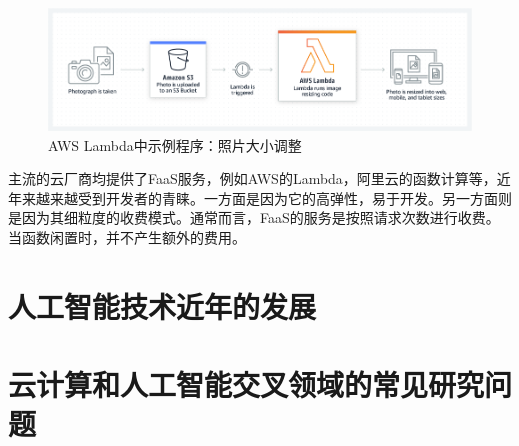 \begin{figure}
    \centerline{\includegraphics[width=\textwidth]{figures/aws-lambda-resize.png}}
    \caption{AWS Lambda中示例程序：照片大小调整}
    \label{aws_resize}
\end{figure}

主流的云厂商均提供了FaaS服务，例如AWS的Lambda，阿里云的函数计算等，近年来越来越受到开发者的青睐。一方面是因为它的高弹性，易于开发。另一方面则是因为其细粒度的收费模式。通常而言，FaaS的服务是按照请求次数进行收费。当函数闲置时，并不产生额外的费用。

\section{人工智能技术近年的发展}



\section{云计算和人工智能交叉领域的常见研究问题}

\subsection{}
\subsection{}
